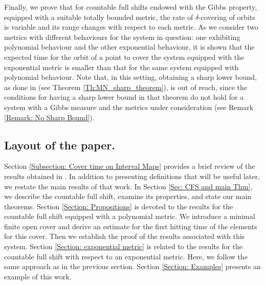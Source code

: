 \documentclass[11pt, reqno]{amsart}
\theoremstyle{plain}%
\theoremstyle{definition}
\theoremstyle{definition}
\def\E{\mathbb E}
\numberwithin{equation}{section}
\begin{document}
Finally, we prove that for countable full shifts endowed with the Gibbs property, equipped with a suitable totally bounded metric, the rate of $\delta$-covering of orbits is variable and its range changes with respect to each metric. As we consider two metrics with different behaviours for the system in question: one exhibiting polynomial behaviour and the other exponential behaviour, it is shown that the expected time for the orbit of a point to cover the system equipped with the exponential metric is smaller than that for the same system equipped with polynomial behaviour. Note that, in this setting, obtaining a sharp lower bound, as done in  \cite[Theorem 2.1]{MikeNatali} (see Theorem \ref{Th:MN_sharp_theorem}), is out of reach, since the conditions for having a sharp lower bound in that theorem do not hold for a system with a Gibbs measure and the metrics under consideration (see Remark \ref{Remark: No Sharp Bound}).

\subsection{Layout of the paper.} Section \ref{Subsection: Cover time on Interval Maps} provides a brief review of the results obtained in \cite{MikeNatali}. In addition to presenting definitions that will be useful later, we restate the main results of that work. In Section \ref{Sec: CFS and main Thm}, we describe the countable full shift, examine its properties, and state our main theorems. Section \ref{Section: Propositions} is devoted to the results for the countable full shift equipped with a polynomial metric. We introduce a minimal finite open cover and derive an estimate for the first hitting time of the elements for this cover. Then we establish the proof of the results associated with this system. Section \ref{Section: exponential metric} is related to the results for the countable full shift with respect to an exponential metric. Here, we follow the same approach as in the previous section. Section \ref{Section: Examples} presents an example of this work.
\end{document}
